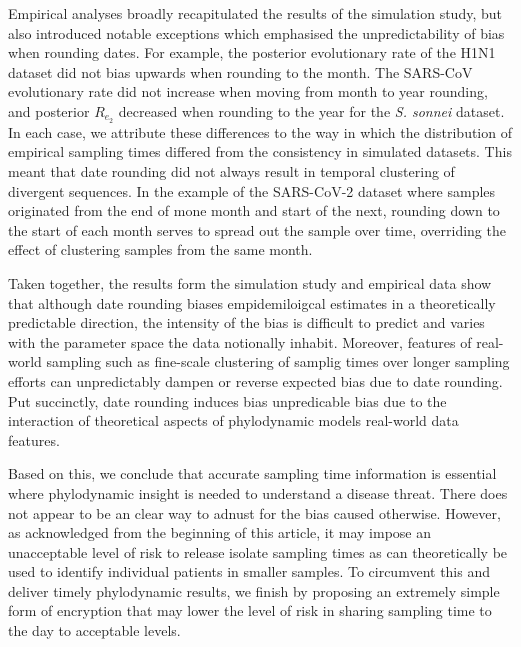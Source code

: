\documentclass{article}
\begin{document}
\begin{spacing}{1.5}
Empirical analyses broadly recapitulated the results of the simulation study, but also introduced notable exceptions which emphasised the unpredictability of bias when rounding dates. For example, the posterior evolutionary rate of the H1N1 dataset did not bias upwards when rounding to the month. The SARS-CoV evolutionary rate did not increase when moving from month to year rounding, and posterior $R_{e_2}$ decreased when rounding to the year for the \textit{S. sonnei} dataset. In each case, we attribute these differences to the way in which the distribution of empirical sampling times differed from the consistency in simulated datasets. This meant that date rounding did not always result in temporal clustering of divergent sequences. In the example of the SARS-CoV-2 dataset where samples originated from the end of mone month and start of the next, rounding down to the start of each month serves to spread out the sample over time, overriding the effect of clustering samples from the same month.

Taken together, the results form the simulation study and empirical data show that although date rounding biases empidemiloigcal estimates in a theoretically predictable direction, the intensity of the bias is difficult to predict and varies with the parameter space the data notionally inhabit. Moreover, features of real-world sampling such as fine-scale clustering of samplig times over longer sampling efforts can unpredictably dampen or reverse expected bias due to date rounding. Put succinctly, date rounding induces bias unpredicable bias due to the interaction of theoretical aspects of phylodynamic models real-world data features.

Based on this, we conclude that accurate sampling time information is essential where phylodynamic insight is needed to understand a disease threat. There does not appear to be an clear way to adnust for the bias caused otherwise. However, as acknowledged from the beginning of this article, it may impose an unacceptable level of risk to release isolate sampling times as can theoretically be used to identify individual patients in smaller samples. To circumvent this and deliver timely phylodynamic results, we finish by proposing an extremely simple form of encryption that may lower the level of risk in sharing sampling time to the day to acceptable levels.


\end{spacing}
\end{document}
